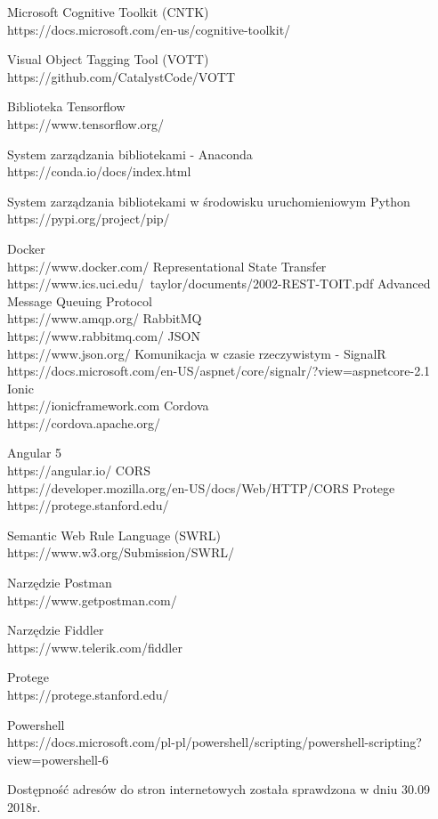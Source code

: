 \begin{thebibliography}{1}
 Microsoft Cognitive Toolkit (CNTK)
\\
https://docs.microsoft.com/en-us/cognitive-toolkit/

 Visual Object Tagging Tool (VOTT)
\\
https://github.com/CatalystCode/VOTT

 Biblioteka Tensorflow
\\
https://www.tensorflow.org/

 System zarządzania bibliotekami - Anaconda
\\
https://conda.io/docs/index.html

 System zarządzania bibliotekami w środowisku uruchomieniowym Python
\\
https://pypi.org/project/pip/


 Docker
\\
https://www.docker.com/
 Representational State Transfer
\\
https://www.ics.uci.edu/~taylor/documents/2002-REST-TOIT.pdf
Advanced Message Queuing Protocol
\\
https://www.amqp.org/
 RabbitMQ
\\
https://www.rabbitmq.com/
 JSON
\\
https://www.json.org/
 Komunikacja w czasie rzeczywistym - SignalR
\\
https://docs.microsoft.com/en-US/aspnet/core/signalr/?view=aspnetcore-2.1
 Ionic
\\
https://ionicframework.com
 Cordova
\\
https://cordova.apache.org/

 Angular 5
\\
https://angular.io/
CORS
\\
https://developer.mozilla.org/en-US/docs/Web/HTTP/CORS
Protege
\\
https://protege.stanford.edu/

Semantic Web Rule Language (SWRL)
\\
https://www.w3.org/Submission/SWRL/

Narzędzie Postman
\\
https://www.getpostman.com/


Narzędzie Fiddler
\\
https://www.telerik.com/fiddler

 Protege
\\
https://protege.stanford.edu/

 Powershell
\\
https://docs.microsoft.com/pl-pl/powershell/scripting/powershell-scripting?view=powershell-6

\end{thebibliography}

Dostępność adresów do stron internetowych została sprawdzona w dniu 30.09 2018r.